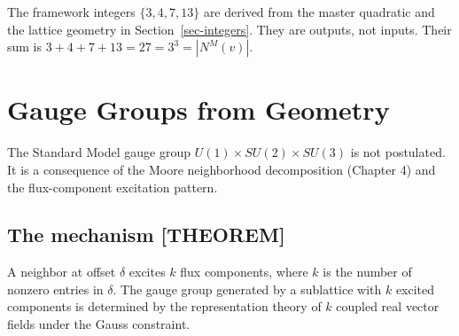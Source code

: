\documentclass[
  11pt,
  letterpaper,
  twoside,
  openany]{book}
\makeatletter
\let\orig@section\section
\renewcommand{\section}{\needspace{8\baselineskip}\orig@section}
\makeatother
\begin{document}
The framework integers \(\{3, 4, 7, 13\}\) are derived from the master
quadratic and the lattice geometry in Section~\ref{sec-integers}. They
are outputs, not inputs. Their sum is
\(3 + 4 + 7 + 13 = 27 = 3^3 = |N^M(v)|\).

\chapter{Gauge Groups from Geometry}\label{sec-gauge}

The Standard Model gauge group \(U(1) \times SU(2) \times SU(3)\) is not
postulated. It is a consequence of the Moore neighborhood decomposition
(Chapter 4) and the flux-component excitation pattern.

\section{The mechanism {[}THEOREM{]}}\label{the-mechanism-theorem}

A neighbor at offset \(\delta\) excites \(k\) flux components, where
\(k\) is the number of nonzero entries in \(\delta\). The gauge group
generated by a sublattice with \(k\) excited components is determined by
the representation theory of \(k\) coupled real vector fields under the
Gauss constraint.
\end{document}
